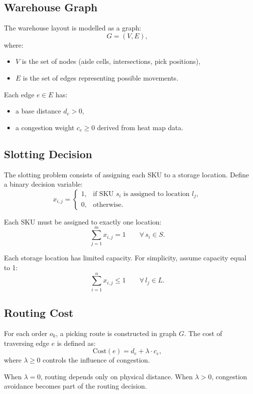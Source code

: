 \documentclass[12pt,a4paper]{article}
\begin{document}
\subsection{Warehouse Graph}

The warehouse layout is modelled as a graph:
\[
  G = (V, E),
\]
where:
\begin{itemize}
  \item $V$ is the set of nodes (aisle cells, intersections, pick positions),
  \item $E$ is the set of edges representing possible movements.
\end{itemize}

Each edge $e \in E$ has:
\begin{itemize}
  \item a base distance $d_e > 0$,
  \item a congestion weight $c_e \geq 0$ derived from heat map data.
\end{itemize}

\subsection{Slotting Decision}

The slotting problem consists of assigning each SKU to a storage location.
Define a binary decision variable:
\[
  x_{i,j} =
  \begin{cases}
    1, & \text{if SKU } s_i \text{ is assigned to location } l_j,\\
    0, & \text{otherwise.}
  \end{cases}
\]

Each SKU must be assigned to exactly one location:
\[
  \sum_{j=1}^{m} x_{i,j} = 1 \qquad \forall\, s_i \in S.
\]

Each storage location has limited capacity. For simplicity, assume capacity equal to 1:
\[
  \sum_{i=1}^{n} x_{i,j} \leq 1 \qquad \forall\, l_j \in L.
\]

\subsection{Routing Cost}

For each order $o_k$, a picking route is constructed in graph $G$.
The cost of traversing edge $e$ is defined as:
\[
  \mathrm{Cost}(e) = d_e + \lambda \cdot c_e,
\]
where $\lambda \geq 0$ controls the influence of congestion.

When $\lambda = 0$, routing depends only on physical distance. When $\lambda > 0$,
congestion avoidance becomes part of the routing decision.
\end{document}
